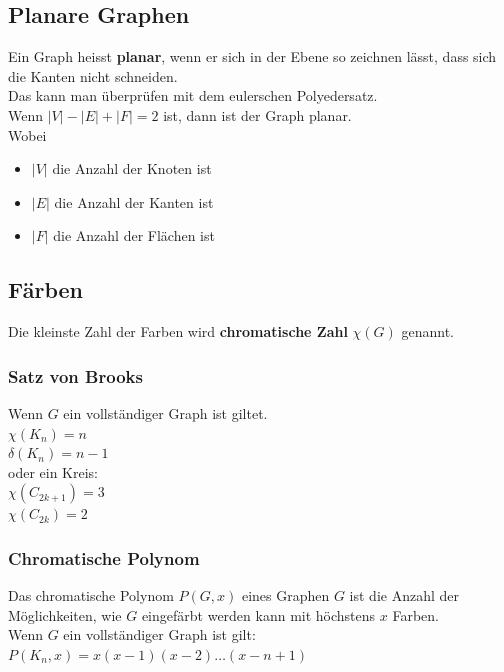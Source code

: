 \documentclass[12pt]{scrartcl}
\begin{document}
\subsection{Planare Graphen}
Ein Graph heisst \textbf{planar}, wenn er sich in der Ebene so zeichnen lässt, dass sich
die Kanten nicht schneiden.\\

Das kann man überprüfen mit dem eulerschen Polyedersatz.\\
Wenn $|V| - |E| + |F| = 2$ ist, dann ist der Graph planar.\\

Wobei
\begin{itemize}
    \item $|V|$ die Anzahl der Knoten ist
    \item $|E|$ die Anzahl der Kanten ist
    \item $|F|$ die Anzahl der Flächen ist
\end{itemize}


\subsection{Färben}
Die kleinste Zahl der Farben wird \textbf{chromatische Zahl} $\chi(G)$ genannt.\\

\subsubsection{Satz von Brooks}
Wenn $G$ ein vollständiger Graph ist giltet.\\
$\chi(K_n) = n$\\
$\delta(K_n) = n - 1$\\

oder ein Kreis:\\
$\chi(C_{2k+1}) = 3$\\
$\chi(C_{2k}) = 2$\\


\newpage
\subsubsection{Chromatische Polynom}
Das chromatische Polynom $P(G,x)$ eines Graphen $G$ ist die Anzahl der Möglichkeiten,
wie $G$ eingefärbt werden kann mit höchstens $x$ Farben.\\

Wenn $G$ ein vollständiger Graph ist gilt:\\
$P(K_n,x) = x(x-1)(x-2) \dots (x-n+1)$\\
\end{document}
